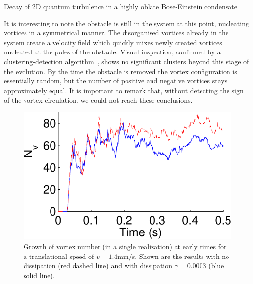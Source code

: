 \begin{chapter}{\label{cha:shin}Decay of 2D quantum turbulence in a highly oblate Bose-Einstein condensate}

It is interesting to note the obstacle is still in the system 
at this point, nucleating vortices in a symmetrical manner. 
The disorganised vortices already in the system create a velocity 
field which quickly mixes newly created vortices nucleated at the
poles of the obstacle. Visual inspection, confirmed by a 
clustering-detection algorithm~\citep{white12,reeves_billam_13}, 
shows no significant clusters beyond this stage of the evolution. 
By the time the obstacle is removed the vortex configuration is 
essentially random, but 
the number of positive and negative vortices stays approximately equal.
It is important to remark that, without detecting the sign of the vortex circulation, we
could not reach these conclusions.

\begin{figure}
\begin{minipage}{0.5\textwidth}
\caption{\label{fig:N_vTime} Growth of vortex number (in a single realization) at early times for a translational speed of $v=1.4$mm/s. Shown are the results with no dissipation (red dashed line) and with dissipation $\gamma=0.0003$ (blue solid line).}
\end{minipage} \hfill
\begin{minipage}{0.5\textwidth}
\centering
\includegraphics[width=0.9\linewidth]{shin/fig3}
\end{minipage} \hfill
\end{figure}

\end{chapter}
